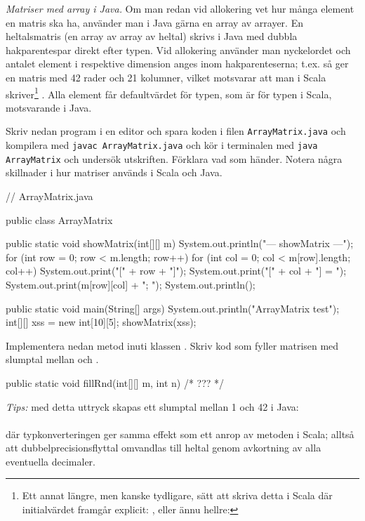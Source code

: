 \Task \label{task:arraymatrix-java} \emph{Matriser med array i Java.} Om man redan vid allokering vet hur många element en matris ska ha, använder man i Java gärna en array av arrayer. En heltalsmatris (en array av array av heltal) skrivs i Java med dubbla hakparentespar  direkt efter typen. Vid allokering använder man nyckelordet  och antalet element i respektive dimension anges inom hakparenteserna; t.ex. så ger  en matris med 42 rader och 21 kolumner, vilket motsvarar att man i Scala skriver\footnote{Ett annat längre, men kanske tydligare, sätt att skriva detta i Scala där initialvärdet framgår explicit: , eller ännu hellre: }  . Alla element får defaultvärdet för typen, som är  för typen  i Scala, motsvarande  i Java.

\Subtask Skriv nedan program i en editor och spara koden i filen \texttt{ArrayMatrix.java} och kompilera med \texttt{javac ArrayMatrix.java} och kör i terminalen med \texttt{java ArrayMatrix} och undersök utskriften. Förklara vad som händer. Notera några skillnader i hur matriser används i Scala och Java.


\begin{Code}[language=Java]
// ArrayMatrix.java

public class ArrayMatrix {

    public static void showMatrix(int[][] m){
        System.out.println("\n--- showMatrix ---");
        for (int row = 0; row < m.length; row++){
            for (int col = 0; col < m[row].length; col++) {
                System.out.print("[" + row + "]");
                System.out.print("[" + col + "] = ");
                System.out.print(m[row][col] + "; ");
            }
            System.out.println();
        }
    }

    public static void main(String[] args) {
        System.out.println("ArrayMatrix test");
        int[][] xss = new int[10][5];
        showMatrix(xss);
    }
}
\end{Code}

\Subtask Implementera nedan metod  inuti klassen . Skriv kod som fyller matrisen  med slumptal mellan  och .
\begin{Code}[language=Java]
    public static void fillRnd(int[][] m, int n){
        /* ??? */
    }
\end{Code}
\noindent \emph{Tips:} med detta uttryck skapas ett slumptal mellan 1 och 42 i Java:\\
 \\
där typkonverteringen  ger samma effekt som ett anrop av metoden  i Scala; alltså att dubbelprecisionsflyttal omvandlas till heltal genom avkortning av alla eventuella decimaler.


